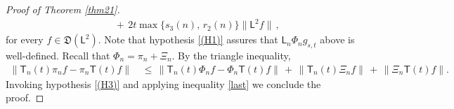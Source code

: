 \documentclass[10pt,a4paper]{amsart}
\newcommand{\mf}[1]{{\mathfrak #1}}
\newcommand{\msf}[1]{{\mathsf #1}}
\newcommand{\norm}[1]{\lVert#1\rVert}
\begin{document}
\begin{proof}[Proof of Theorem \ref{thm21}]
\begin{align}
			&\qquad\,+\,2t\max\{s_3(n),\,r_2(n)\}\norm{\msf{L}^2f}\,,\label{last}
		\end{align}
		for every $f \in \mf{D}(\msf{L}^2)$. Note that  hypothesis \ref{(H1)} assures that $\msf{L}_n\Phi_ng_{s,t}$ above is well-defined. Recall that $\Phi_n = \pi_n + \Xi_n$. By the triangle inequality,
		\begin{align*}
			\norm{\msf{T}_n(t)\pi_nf-\pi_n\msf{T}(t)f}\,&\leq\,\norm{\msf{T}_n(t)\Phi_nf-\Phi_n\msf{T}(t)f}\,+\,\norm{\msf{T}_n(t)\Xi_nf}\,+\,\norm{\Xi_n\msf{T}(t)f}.
		\end{align*}
		Invoking hypothesis \ref{(H3)} and applying inequality \eqref{last} we  conclude the proof.
	\end{proof}
\end{document}
